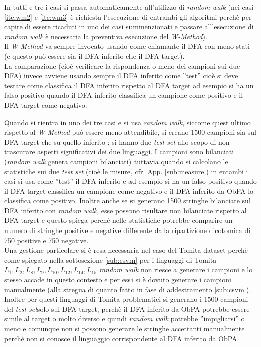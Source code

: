 In tutti e tre i casi si passa automaticamente  all'utilizzo di \textit{random walk} (nei casi \ref{ite:wm2} e \ref{ite:wm3} è richiesta l'esecuzione di entrambi gli algoritmi perchè per capire di essere ricaduti in uno dei casi summenzionati e passare all'esecuzione di \textit{random walk} è necessaria la preventiva esecuzione del \textit{W-Method}).  \\
Il \textit{W-Method} va sempre invocato usando come chiamante il \ac{DFA} con meno stati  (e questo può essere sia il \ac{DFA} inferito che il \ac{DFA} target).\\
La comparazione (cioè verificare la rispondenza o meno dei campioni sui due \ac{DFA}) invece avviene usando sempre il \ac{DFA} inferito come ''test'' cioè si deve testare come classifica il \ac{DFA} inferito rispetto al \ac{DFA} target ad esempio si ha un falso positivo quando il \ac{DFA} inferito classifica un campione come positivo e il \ac{DFA} target come negativo.

Quando si rientra in uno dei tre casi e si usa \textit{random walk}, siccome quest ultimo rispetto al \textit{W-Method} può essere meno attendibile, si creano 1500 campioni sia sul \ac{DFA} target che su quello inferito ; si hanno due \textit{test set}  allo scopo di non trascurare aspetti significativi dei due linguaggi.  I campioni  sono bilanciati (\textit{random walk} genera campioni bilanciati)  tuttavia quando si calcolano le statistiche sui due \textit{test set} (cioè le misure, cfr. App. \ref{sub:measure}) in entambi i casi si usa come ''test'' il \ac{DFA} inferito e ad esempio si ha un falso positivo quando il \ac{DFA} target classifica un campione come negativo e il \ac{DFA} inferito da \ac{ObPA} lo classifica come positivo. Inoltre anche se si generano 1500 stringhe bilanciate sul \ac{DFA} inferito con \textit{random walk}, esse possono risultare non bilanciate rispetto al \ac{DFA} target e questo spiega perchè nelle statistiche potrebbe comparire un numero di stringhe positive e negative differente dalla ripartizione dicotomica di 750 positive e 750 negative.\\
Una gestione particolare si è resa necessaria nel caso del Tomita dataset perchè come spiegato   nella sottosezione \ref{sub:csvm} per i linguaggi di Tomita$L_1,L_2,L_8,L_9,L_{10},L_{12},L_{14},L_{15}$  \textit{random walk} non riesce a generare i campioni e lo stesso accade in questo contesto e per essi si è dovuto generare i campioni manualmente (alla stregua di quanto fatto in fase di addestramento \ref{sub:csvm}). Inoltre per questi linguaggi di Tomita problematici si generano i 1500 campioni del \textit{test set}solo sul \ac{DFA} target, perchè il \ac{DFA} inferito da \ac{ObPA} potrebbe essere simile al target o molto diverso e quindi \textit{random walk} potrebbe ''impigliarsi'' o meno e comunque non si possono generare le stringhe accettanti manualmente perchè non si conosce il linguaggio corrispondente al \ac{DFA} inferito da \ac{ObPA}.\\

